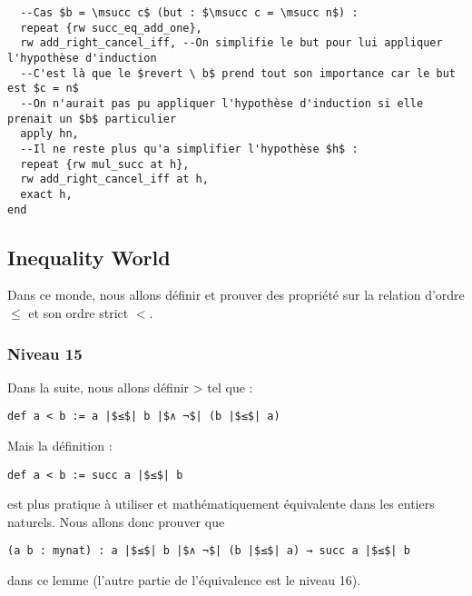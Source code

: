 \begin{verbatim}
  --Cas $b = \msucc c$ (but : $\msucc c = \msucc n$) :
  repeat {rw succ_eq_add_one},
  rw add_right_cancel_iff, --On simplifie le but pour lui appliquer l'hypothèse d'induction
  --C'est là que le $revert \ b$ prend tout son importance car le but est $c = n$
  --On n'aurait pas pu appliquer l'hypothèse d'induction si elle prenait un $b$ particulier
  apply hn,
  --Il ne reste plus qu'a simplifier l'hypothèse $h$ :
  repeat {rw mul_succ at h},
  rw add_right_cancel_iff at h,
  exact h,
end
\end{verbatim}

\subsection{Inequality World}

Dans ce monde, nous allons définir et prouver des propriété sur la relation d'ordre $≤$ et son ordre strict $<$.

\subsubsection{Niveau 15}

Dans la suite, nous allons définir > tel que :
\begin{verbatim}
def a < b := a |$≤$| b |$∧ ¬$| (b |$≤$| a)
\end{verbatim}
Mais la définition :
\begin{verbatim}
def a < b := succ a |$≤$| b
\end{verbatim}
est plus pratique à utiliser et mathématiquement équivalente dans les entiers naturels.
Nous allons donc prouver que 
\begin{verbatim}
(a b : mynat) : a |$≤$| b |$∧ ¬$| (b |$≤$| a) → succ a |$≤$| b
\end{verbatim}
dans ce lemme (l'autre partie de l'équivalence est le niveau 16).

